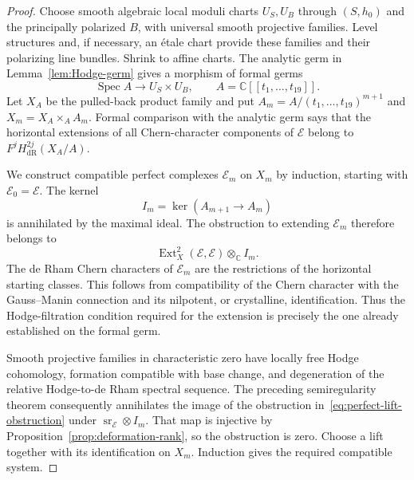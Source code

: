 \documentclass[11pt]{article}
\numberwithin{equation}{section}
\theoremstyle{definition}
\theoremstyle{remark}
\newcommand{\C}{\mathbb C}
\newcommand{\Ext}{\operatorname{Ext}}
\newcommand{\Spec}{\operatorname{Spec}}
\begin{document}
\begin{proof}
Choose smooth algebraic local moduli charts $U_S,U_B$ through
$(S,h_0)$ and the principally polarized $B$, with universal smooth
projective families. Level structures and, if necessary, an
\'etale chart provide these families and their polarizing line
bundles. Shrink to affine charts. The analytic germ in
Lemma~\ref{lem:Hodge-germ} gives a morphism of formal germs
\[
 \Spec A\longrightarrow U_S\times U_B,\qquad
 A=\C[[t_1,\ldots,t_{19}]].
\]
Let $X_A$ be the pulled-back product family and put
$A_m=A/(t_1,\ldots,t_{19})^{m+1}$ and $X_m=X_A\times_A A_m$.
Formal comparison with the analytic germ says that the horizontal
extensions of all Chern-character components of $\mathcal E$
belong to $F^jH^{2j}_{\mathrm{dR}}(X_A/A)$.

We construct compatible perfect complexes $\mathcal E_m$ on $X_m$
by induction, starting with $\mathcal E_0=\mathcal E$.
The kernel
\[
 I_m=\ker(A_{m+1}\to A_m)
\]
is annihilated by the maximal ideal. The obstruction to extending
$\mathcal E_m$ therefore belongs to
\begin{equation}\label{eq:perfect-lift-obstruction}
 \Ext^2_X(\mathcal E,\mathcal E)\otimes_\C I_m.
\end{equation}
The de Rham Chern characters of $\mathcal E_m$ are the restrictions
of the horizontal starting classes. This follows from compatibility
of the Chern character with the Gauss--Manin connection and its
nilpotent, or crystalline, identification. Thus the Hodge-filtration
condition required for the extension is precisely the one already
established on the formal germ.

Smooth projective families in characteristic zero have locally
free Hodge cohomology, formation compatible with base change, and
degeneration of the relative Hodge-to-de Rham spectral sequence.
The preceding semiregularity theorem consequently annihilates the
image of the obstruction in~\eqref{eq:perfect-lift-obstruction} under
$\operatorname{sr}_{\mathcal E}\otimes I_m$. That map is injective
by Proposition~\ref{prop:deformation-rank}, so the obstruction is
zero. Choose a lift together with its identification on $X_m$.
Induction gives the required compatible system.


\end{proof}
\end{document}
